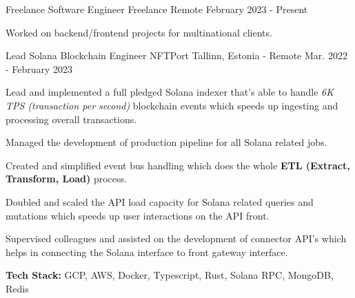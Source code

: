 
\begin{cventries}
    \cventry
        {Freelance Software Engineer}
        {Freelance}
        {Remote}
        {February 2023 - Present}
        {
            \begin{cvitems}
                \item {Worked on backend/frontend projects for multinational clients.}
            \end{cvitems}
        }
    \cventry
        {Lead Solana Blockchain Engineer}
        {NFTPort}
        {Tallinn, Estonia - Remote}
        {Mar. 2022 - February 2023}
        {
            \begin{cvitems}
                \item
                    {Lead and implemented a full pledged Solana indexer that's able to handle \emph{6K TPS (transaction per second)} blockchain events which speeds up ingesting and processing overall transactions.}
                \item
                    {Managed the development of production pipeline for all Solana related jobs.}
                \item
                    {Created and simplified event bus handling which does the whole \textbf{ETL (Extract, Transform, Load)} process.}
                \item
                    {Doubled and scaled the API load capacity for Solana related queries and mutations which speeds up user interactions on the API front.}
                \item
                    {Supervised colleagues and assisted on the development of connector API's which helps in connecting the Solana interface to front gateway interface.}
                \item 
                    {\textbf{Tech Stack:} GCP, AWS, Docker, Typescript, Rust, Solana RPC, MongoDB, Redis}
            \end{cvitems}
        }        


\end{cventries}
